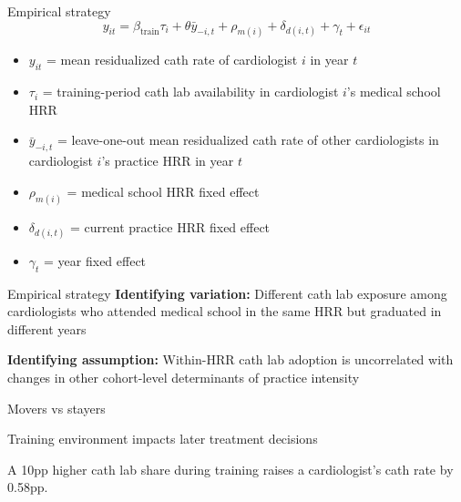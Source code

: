 \documentclass[10pt,aspectratio=169]{beamer}
\begin{document}
\begin{frame}{Empirical strategy}
    \begin{equation*}
        y_{it} = \beta_\text{train}\tau_i + \theta\bar{y}_{-i,t} + \rho_{m(i)} + \delta_{d(i,t)} + \gamma_t + \epsilon_{it}
    \end{equation*}
    \begin{itemize}
        \item $y_{it}$ = mean residualized cath rate of cardiologist $i$ in year $t$
        \item $\tau_i$ = training-period cath lab availability in cardiologist $i$'s medical school HRR
        \item $\bar{y}_{-i,t}$ = leave-one-out mean residualized cath rate of other cardiologists in cardiologist $i$'s practice HRR in year $t$
        \item $\rho_{m(i)}$ = medical school HRR fixed effect
        \item $\delta_{d(i,t)}$ = current practice HRR fixed effect
        \item $\gamma_t$ = year fixed effect
    \end{itemize}
\end{frame}

\begin{frame}{Empirical strategy}
    \textbf{Identifying variation:} Different cath lab exposure among cardiologists who attended medical school in the same HRR but graduated in different years

    \vspace{5mm}
    \textbf{Identifying assumption:} Within-HRR cath lab adoption is uncorrelated with changes in other cohort-level determinants of practice intensity
\end{frame}

\begin{frame}{Movers vs stayers}
    \centering
    
\end{frame}

\begin{frame}[label=training]{Training environment impacts later treatment decisions}
    \centering
    

    \vspace{7.5mm}
    A 10pp higher cath lab share during training raises a cardiologist's cath rate by 0.58pp.
    
    \hyperlink{training-no-med-hrr}{}
\end{frame}
\end{document}
